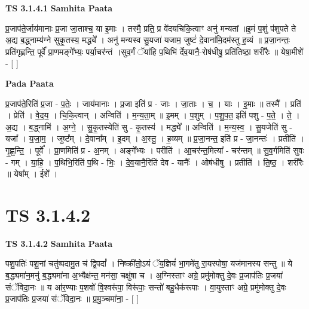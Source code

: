 \documentclass[17pt]{extarticle}
\begin{document}
\textbf{TS 3.1.4.1 } \newline
\textbf{Samhita Paata} \newline

प्र॒जाप॑ते॒र्जाय॑मानाः प्र॒जा जा॒ताश्च॒ या इ॒माः । तस्मै॒ प्रति॒ प्र वे॑दयचिकि॒त्वाꣳ अनु॑ मन्यतां ॥इ॒मं प॒शुं प॑शुपते ते अ॒द्य ब॒द्ध्नाम्य॑ग्ने सुकृ॒तस्य॒ मद्ध्ये᳚ । अनु॑ मन्यस्व सु॒यजा॑ यजाम॒ जुष्टं॑ दे॒वाना॑मि॒दम॑स्तु ह॒व्यं ॥ प्र॒जा॒नन्तः॒ प्रति॑गृह्णन्ति॒ पूर्वे᳚ प्रा॒णमङ्गे᳚भ्यः॒ पर्या॒चर॑न्तं ।सुव॒र्गं ॅया॑हि प॒थिभि॑ र्देव॒यानै॒-रोष॑धीषु॒ प्रति॑तिष्ठा॒ शरी॑रैः ॥ येषा॒मीशे॑ - [  ] \newline

\textbf{Pada Paata} \newline

प्र॒जाप॑ते॒रिति॑ प्र॒जा - प॒तेः॒ । जाय॑मानाः । प्र॒जा इति॑ प्र - जाः । जा॒ताः । च॒ । याः । इ॒माः ॥ तस्मै᳚ । प्रति॑ । प्रेति॑ । वे॒द॒य॒ । चि॒कि॒त्वान् । अन्विति॑ । म॒न्य॒ता॒म् ॥ इ॒मम् । प॒शुम् । प॒शु॒प॒त॒ इति॑ पशु - प॒ते॒ । ते॒ । अ॒द्य । ब॒द्ध्नामि॑ । अ॒ग्ने॒ । सु॒कृ॒तस्येति॑ सु - कृ॒तस्य॑ । मद्ध्ये᳚ ॥ अन्विति॑ । म॒न्य॒स्व॒ । सु॒यजेति॑ सु - यजा᳚ । य॒जा॒म॒ । जुष्ट᳚म् । दे॒वाना᳚म् । इ॒दम् । अ॒स्तु॒ । ह॒व्यम् ॥ प्र॒जा॒नन्त॒ इति॑ प्र - जा॒नन्तः॑ । प्रतीति॑ । गृ॒ह्ण॒न्ति॒ । पूर्वे᳚ । प्रा॒णमिति॑ प्र - अ॒नम् । अङ्गे᳚भ्यः । परीति॑ । आ॒चर॑न्त॒मित्या᳚ - चर॑न्तम् ॥ सु॒व॒र्गमिति॑ सुवः - गम् । या॒हि॒ । प॒थिभि॒रिति॑ प॒थि - भिः॒ । दे॒व॒यानै॒रिति॑ देव - यानैः᳚ । ओष॑धीषु । प्रतीति॑ । ति॒ष्ठ॒ । शरी॑रैः ॥ येषा᳚म् । ईशे᳚ ।  \newline





\section{ TS 3.1.4.2 }

\textbf{TS 3.1.4.2 } \newline
\textbf{Samhita Paata} \newline

पशु॒पतिः॑ पशू॒नां चतु॑ष्पदामु॒त च॑ द्वि॒पदां᳚ । निष्क्री॑तो॒ऽयं ॅय॒ज्ञियं॑ भा॒गमे॑तु रा॒यस्पोषा॒ यज॑मानस्य सन्तु ॥ ये ब॒द्ध्यमा॑न॒मनु॑ ब॒द्ध्यमा॑ना अ॒भ्यैक्ष॑न्त॒ मन॑सा॒ चक्षु॑षा च । अ॒ग्निस्ताꣳ अग्रे॒ प्रमु॑मोक्तु दे॒वः प्र॒जाप॑तिः प्र॒जया॑ संॅविदा॒नः ॥ य आ॑र॒ण्याः प॒शवो॑ वि॒श्वरू॑पा॒ विरू॑पाः॒ सन्तो॑ बहु॒धैक॑रूपाः । वा॒युस्ताꣳ अग्रे॒ प्रमु॑मोक्तु दे॒वः प्र॒जाप॑तिः प्र॒जया॑ संॅविदा॒नः ॥ प्र॒मु॒ञ्चमा॑ना॒ - [  ] \newline
\end{document}
